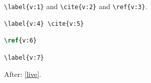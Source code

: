 \documentclass{article}
\begin{document}
\verb|\label{v:1}| and \verb*+\cite{v:2}+ and \lstinline|\ref{v:3}|.
\begin{verbatim}
\label{v:4} \cite{v:5}
\end{verbatim}
\begin{lstlisting}[language=TeX]
\ref{v:6}
\end{lstlisting}
\begin{verbatim}
\label{v:7}
\end{verbatim}
After: \label{live} \ref{live}.
\end{document}
